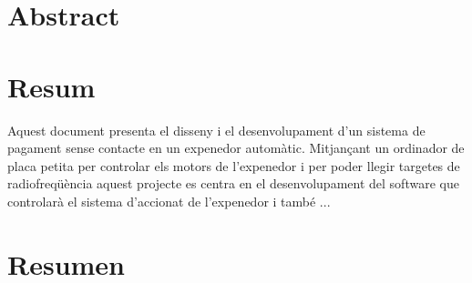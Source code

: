 \chapter*{Abstract}


\newpage{\cleardoublepage}

\chapter*{Resum}

Aquest document presenta el disseny i el desenvolupament d'un sistema de pagament sense contacte en un expenedor automàtic. Mitjançant un ordinador de placa petita per controlar els motors de l'expenedor i per poder llegir targetes de radiofreqüència aquest projecte es centra en el desenvolupament del software que controlarà el sistema d'accionat de l'expenedor i també ...

\newpage{\cleardoublepage}

\chapter*{Resumen}



